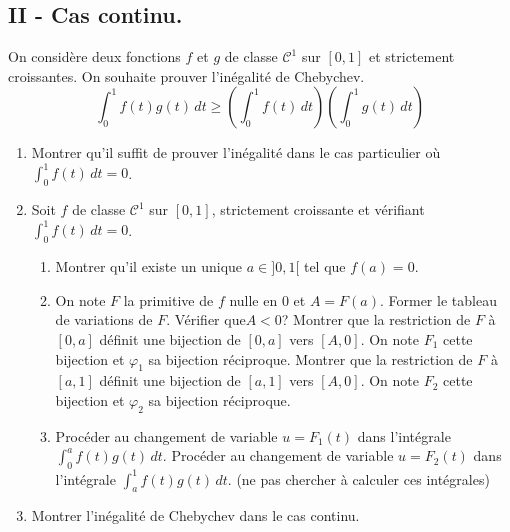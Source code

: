 \subsection*{II - Cas continu.}
On considère deux fonctions $f$ et $g$ de classe $\mathcal{C}^1$ sur $[0,1]$ et strictement croissantes. On souhaite prouver l'inégalité de Chebychev.
\begin{displaymath}
 \int_0^1f(t)g(t)\,dt \geq \left( \int_0^1f(t)\,dt\right) \left( \int_0^1g(t)\,dt\right) 
\end{displaymath}
\begin{enumerate}
 \item Montrer qu'il suffit de prouver l'inégalité dans le cas particulier où $\int_0^1f(t)\,dt=0$.
 \item Soit $f$ de classe $\mathcal{C}^1$ sur $[0,1]$, strictement croissante et vérifiant $\int_0^1f(t)\,dt=0$.
\begin{enumerate}
\item Montrer qu'il existe un unique $a\in ]0,1[$ tel que $f(a)=0$.
\item On note $F$ la primitive de $f$ nulle en $0$ et $A=F(a)$.\newline
Former le tableau de variations de $F$. Vérifier que$A<0$?\newline
Montrer que la restriction de $F$ à $[0,a]$ définit une bijection de $[0,a]$ vers $[A,0]$. On note $F_1$ cette bijection et $\varphi_1$ sa bijection réciproque.\newline
Montrer que la restriction de $F$ à $[a,1]$ définit une bijection de $[a,1]$ vers $[A,0]$. On note $F_2$ cette bijection et $\varphi_2$ sa bijection réciproque. 
\item Procéder au changement de variable $u=F_1(t)$ dans l'intégrale $\int_0^af(t)g(t)\,dt$.\newline
Procéder au changement de variable $u=F_2(t)$ dans l'intégrale $\int_a^1f(t)g(t)\,dt$.\newline
(ne pas chercher à calculer ces intégrales)
\end{enumerate}
\item Montrer l'inégalité de Chebychev dans le cas continu.
\end{enumerate}

